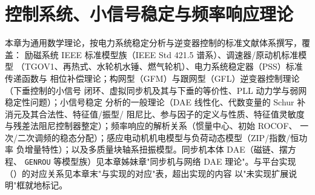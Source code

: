 
\section{控制系统、小信号稳定与频率响应理论}\label{sec:dy-th-ctl-main}

\begin{theorynote}
本章为通用数学理论，按电力系统稳定分析与逆变器控制的标准文献体系撰写，覆盖：
励磁系统 IEEE 标准模型族（IEEE Std 421.5 谱系）、调速器/原动机标准模型
（TGOV1、再热式、水轮机水锤、燃气轮机）、电力系统稳定器（PSS）标准传递函数与
相位补偿理论；构网型（GFM）与跟网型（GFL）逆变器控制理论（下垂控制的小信号
闭环、虚拟同步机及其与下垂的等价性、PLL 动力学与弱网稳定性问题）；小信号稳定
分析的一般理论（DAE 线性化、代数变量的 Schur 补消元及其合法性、特征值/振型/
阻尼比、参与因子的定义与性质、特征值灵敏度与残差法阻尼控制器整定）；频率响应的解析关系（惯量中心、初始 ROCOF、
一次/二次调频的稳态分配）；感应电动机机电模型与负荷动态模型（ZIP/指数/恒功率
负增量特性）；以及多质量块轴系扭振模型。同步机本体 DAE（磁链、摆方程、
\texttt{GENROU} 等模型族）见本章姊妹章"同步机与网络 DAE 理论"。与平台实现
（）的对应关系见本章末"与实现的对应"表，超出实现的内容
以"未实现扩展说明"框就地标记。
\end{theorynote}

